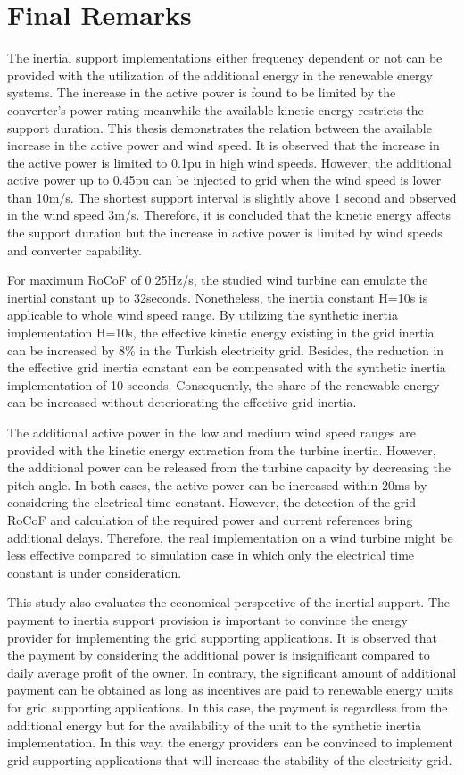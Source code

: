\section{Final Remarks}
The inertial support implementations either frequency dependent or not can be provided with the utilization of the additional energy in the renewable energy systems. The increase in the active power is found to be limited by the converter's power rating meanwhile the available kinetic energy restricts the support duration. This thesis demonstrates the relation between the available increase in the active power and wind speed. It is observed that the increase in the active power is limited to 0.1pu in high wind speeds. However, the additional active power up to 0.45pu can be injected to grid when the wind speed is lower than 10m/s. The shortest support interval is slightly above 1 second and observed in the wind speed 3m/s. Therefore, it is concluded that the kinetic energy affects the support duration but the increase in active power is limited by wind speeds and converter capability. \par
For maximum RoCoF of 0.25Hz/s, the studied wind turbine can emulate the inertial constant up to 32seconds. Nonetheless, the inertia constant H=10s is applicable to whole wind speed range. By utilizing the synthetic inertia implementation H=10s, the effective kinetic energy existing in the grid inertia can be increased by 8\% in the Turkish electricity grid. Besides, the reduction in the effective grid inertia constant can be compensated with the synthetic inertia implementation of 10 seconds. Consequently, the share of the renewable energy can be increased without deteriorating the effective grid inertia.\par
The additional active power in the low and medium wind speed ranges are provided with the kinetic energy extraction from the turbine inertia. However, the additional power can be released from the turbine capacity by decreasing the pitch angle. In both cases, the active power can be increased within 20ms by considering the electrical time constant. However, the detection of the grid RoCoF and calculation of the required power and current references bring additional delays. Therefore, the real implementation on a wind turbine might be less effective compared to simulation case in which only the electrical time constant is under consideration.\par
This study also evaluates the economical perspective of the inertial support. The payment to inertia support provision is important to convince the energy provider for implementing the grid supporting applications. It is observed that the payment by considering the additional power is insignificant compared to daily average profit of the owner. In contrary, the significant amount of additional payment can be obtained as long as incentives are paid to renewable energy units for grid supporting applications. In this case, the payment is regardless from the additional energy but for the availability of the unit to the synthetic inertia implementation. In this way, the energy providers can be convinced to implement grid supporting applications that will increase the stability of the electricity grid.
\newpage
